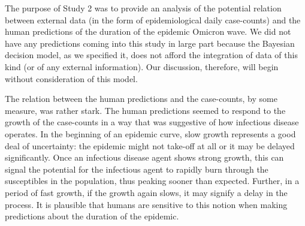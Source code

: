 The purpose of Study 2 was to provide an analysis of the potential relation between external data (in the form of epidemiological daily case-counts) and the human predictions of the duration of the epidemic Omicron wave.  We did not have any predictions coming into this study in large part because the Bayesian decision model, as we specified it, does not afford the integration of data of this kind (or of any external information). Our discussion, therefore, will begin without consideration of this model. 

The relation between the human predictions and the case-counts, by some measure, was rather stark.  The human predictions seemed to respond to the growth of the case-counts in a way that was suggestive of how infectious disease operates.  In the beginning of an epidemic curve, slow growth represents a good deal of uncertainty: the epidemic might not take-off at all or it may be delayed significantly. Once an infectious disease agent shows strong growth, this can signal the potential for the infectious agent to rapidly burn through the susceptibles in the population, thus peaking sooner than expected.  Further, in a period of fast growth, if the growth again slows, it may signify a delay in the process.  It is plausible that humans are sensitive to this notion when making predictions about the duration of the epidemic.
